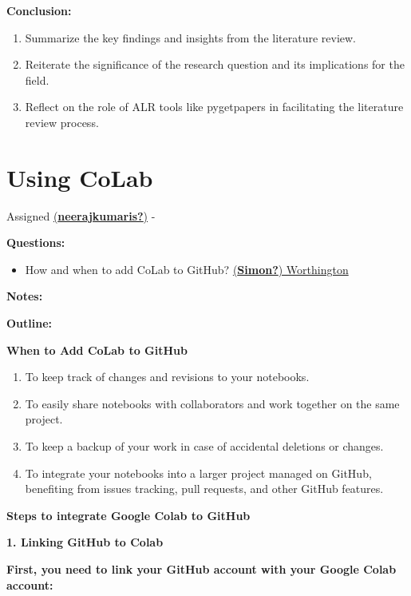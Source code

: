 \documentclass[
  letterpaper,
  DIV=11,
  numbers=noendperiod]{scrreprt}
\providecommand{\tightlist}{%
  \setlength{\itemsep}{0pt}\setlength{\parskip}{0pt}}\usepackage{longtable,booktabs,array}
\begin{document}
\textbf{Conclusion:}

\begin{enumerate}
\def\labelenumi{\arabic{enumi}.}
\tightlist
\item
  Summarize the key findings and insights from the literature review.
\item
  Reiterate the significance of the research question and its
  implications for the field.
\item
  Reflect on the role of ALR tools like pygetpapers in facilitating the
  literature review process.
\end{enumerate}

\section{Using CoLab}\label{using-colab}

Assigned
\href{https://github.com/neerajkumaris}{(\textbf{neerajkumaris?})} -

\textbf{Questions:}

\begin{itemize}
\tightlist
\item
  How and when to add CoLab to GitHub?
  \href{https://github.com/mrchristian}{(\textbf{Simon?}) Worthington}
\end{itemize}

\textbf{Notes:}

\textbf{Outline:}

\textbf{When to Add CoLab to GitHub}

\begin{enumerate}
\def\labelenumi{\arabic{enumi}.}
\item
  To keep track of changes and revisions to your notebooks.
\item
  To easily share notebooks with collaborators and work together on the
  same project.
\item
  To keep a backup of your work in case of accidental deletions or
  changes.
\item
  To integrate your notebooks into a larger project managed on GitHub,
  benefiting from issues tracking, pull requests, and other GitHub
  features.
\end{enumerate}

\textbf{Steps to integrate Google Colab to GitHub}

\textbf{1. Linking GitHub to Colab}

\textbf{First, you need to link your GitHub account with your Google
Colab account:}
\end{document}

